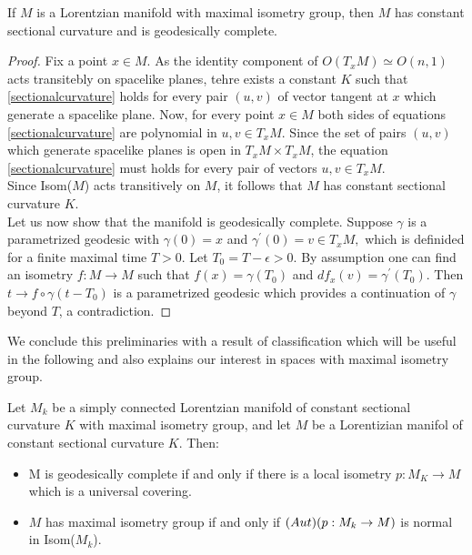 \begin{lemma}
\begin{lemma}\label{maximalisometry}
    If $M$ is a Lorentzian manifold with maximal isometry group, then $M$ has constant sectional curvature and is geodesically complete.
\end{lemma}

\begin{proof}
    Fix a point $x\in M$. As the identity component of $O(T_x M)\simeq O(n,1)$ acts transitebly on spacelike planes, tehre exists a constant $K$ such that \ref{sectionalcurvature} holds for every pair $(u,v)$ of vector tangent at $x$ which generate a spacelike plane. Now, for every point $x\in M$ both sides of equations \ref{sectionalcurvature} are polynomial in $u,v \in T_xM$. Since the set of pairs $(u,v)$ which generate spacelike planes is open in $T_{x}M\times T_{x}M$, the equation \ref{sectionalcurvature} must holds for every pair of vectors $u,v \in T_xM$.\\ Since Isom($M$) acts transitively on $M$, it follows that $M$ has constant sectional curvature $K$.\\
    Let us now show that the manifold is geodesically complete. Suppose $\gamma$ is a parametrized geodesic with $\gamma(0)=x$ and $\gamma^{\prime} (0)=v\in T_xM,$ which is definided for a finite maximal time $T>0.$ Let $T_0=T-\epsilon>0.$ By assumption one can find an isometry $f:M\to M$ such that $f(x)=\gamma(T_0)$ and $df_x(v)=\gamma^{\prime}(T_0).$ Then $t\to f\circ\gamma(t-T_0)$ is a parametrized geodesic which provides a continuation of $\gamma$ beyond $T$, a contradiction. 
\end{proof}

We conclude this preliminaries with a result of classification which will be useful in the following and also explains our interest in spaces with maximal isometry group.
\begin{proposition}\label{classification}
    Let $M_k$ be a simply connected Lorentzian manifold of constant sectional curvature $K$ with maximal isometry group, and let $M$ be a Lorentizian manifol of constant sectional curvature $K$. Then: 
    \begin{itemize}
        \item M is geodesically complete if and only if there is a local isometry $p:M_K\to M$ which is a universal covering.
        \item $M$ has maximal isometry group if and only if $\text(Aut)(p:M_k\to M)$ is normal in Isom($M_k$). 
    \end{itemize}
\end{proposition}


\end{lemma}
